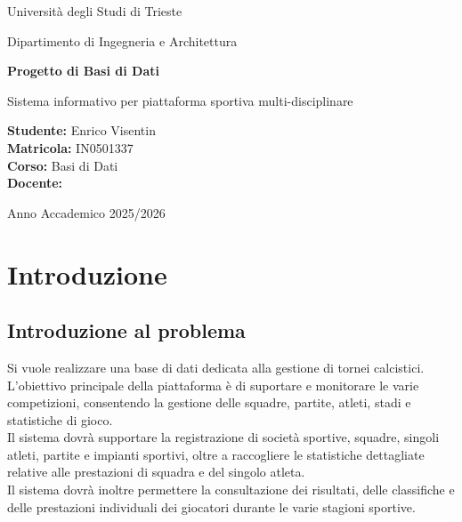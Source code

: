 \documentclass[12pt,a4paper]{report}
\begin{document}
	
	\begin{titlepage}
		\centering
		
		\vspace*{2cm}
		
		{\LARGE Università degli Studi di Trieste\par}
		\vspace{0.5cm}
		{\Large Dipartimento di Ingegneria e Architettura\par}
		
		\vspace{2cm}
		
		{\Huge \textbf{Progetto di Basi di Dati}\par}
		
		\vspace{1cm}
		
		{\Large Sistema informativo per piattaforma sportiva multi-disciplinare\par}
		
		\vspace{2cm}
		
		\begin{flushleft}
			\textbf{Studente:} Enrico Visentin \\
			\textbf{Matricola:} IN0501337 \\
			\textbf{Corso:} Basi di Dati \\
			\textbf{Docente:} 
		\end{flushleft}
		
		\vfill
		
		{\large Anno Accademico 2025/2026\par}
		
	\end{titlepage}
	
	\tableofcontents
	\newpage
	
	
\chapter{Introduzione}

\section{Introduzione al problema}

Si vuole realizzare una base di dati dedicata alla gestione di tornei calcistici. L'obiettivo principale della piattaforma è di suportare e monitorare le varie competizioni, consentendo la gestione delle squadre, partite, atleti, stadi e statistiche di gioco.\\
Il sistema dovrà supportare la registrazione di società sportive, squadre, singoli atleti, partite e impianti sportivi, oltre a raccogliere le statistiche dettagliate relative alle prestazioni di squadra e del singolo atleta.\\
Il sistema dovrà inoltre permettere la consultazione dei risultati, delle classifiche e delle prestazioni individuali dei giocatori durante le varie stagioni sportive.
\end{document}
